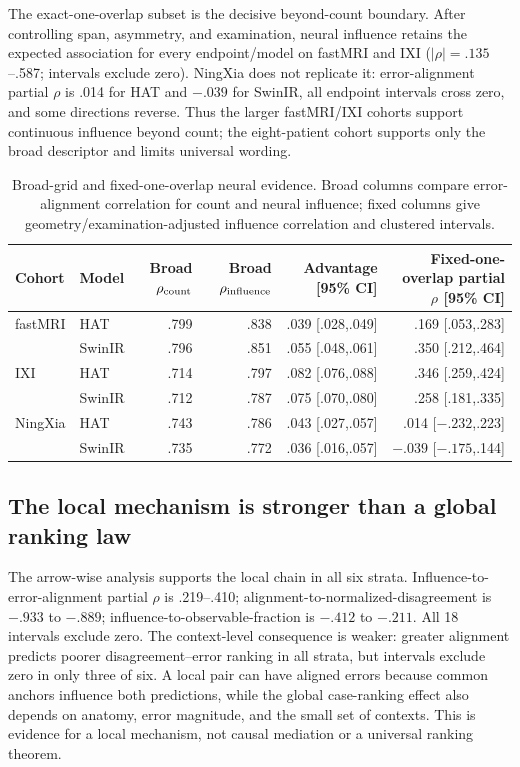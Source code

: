 \documentclass[10pt,twocolumn,letterpaper]{article}
\begin{document}
The exact-one-overlap subset is the decisive beyond-count boundary. After controlling span, asymmetry, and examination, neural influence retains the expected association for every endpoint/model on fastMRI and IXI ($|\rho|=.135$--.587; intervals exclude zero). NingXia does not replicate it: error-alignment partial $\rho$ is .014 for HAT and $-.039$ for SwinIR, all endpoint intervals cross zero, and some directions reverse. Thus the larger fastMRI/IXI cohorts support continuous influence beyond count; the eight-patient cohort supports only the broad descriptor and limits universal wording.

\begin{table}[t]
\centering
\caption{Broad-grid and fixed-one-overlap neural evidence. Broad columns compare error-alignment correlation for count and neural influence; fixed columns give geometry/examination-adjusted influence correlation and clustered intervals.}
\label{tab:neural}
\setlength{\tabcolsep}{4pt}
\begin{tabular}{llrrrr}
\toprule
Cohort & Model & Broad $\rho_{\rm count}$ & Broad $\rho_{\rm influence}$ & Advantage [95\% CI] & Fixed-one-overlap partial $\rho$ [95\% CI] \\
\midrule
fastMRI & HAT & .799 & .838 & .039 [.028,.049] & .169 [.053,.283] \\
 & SwinIR & .796 & .851 & .055 [.048,.061] & .350 [.212,.464] \\
IXI & HAT & .714 & .797 & .082 [.076,.088] & .346 [.259,.424] \\
 & SwinIR & .712 & .787 & .075 [.070,.080] & .258 [.181,.335] \\
NingXia & HAT & .743 & .786 & .043 [.027,.057] & .014 [$-.232$,.223] \\
 & SwinIR & .735 & .772 & .036 [.016,.057] & $-.039$ [$-.175$,.144] \\
\bottomrule
\end{tabular}
\end{table}

\subsection{The local mechanism is stronger than a global ranking law}
The arrow-wise analysis supports the local chain in all six strata. Influence-to-error-alignment partial $\rho$ is .219--.410; alignment-to-normalized-disagreement is $-.933$ to $-.889$; influence-to-observable-fraction is $-.412$ to $-.211$. All 18 intervals exclude zero. The context-level consequence is weaker: greater alignment predicts poorer disagreement--error ranking in all strata, but intervals exclude zero in only three of six. A local pair can have aligned errors because common anchors influence both predictions, while the global case-ranking effect also depends on anatomy, error magnitude, and the small set of contexts. This is evidence for a local mechanism, not causal mediation or a universal ranking theorem.
\end{document}
